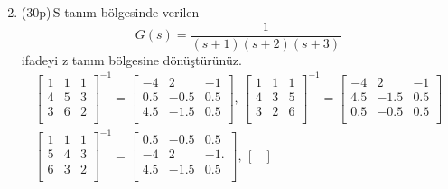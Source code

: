 \begin{enumerate}[\bfseries S1.]
\begin{equation*}
    \end{equation*}
    \item (30p)\,S tanım bölgesinde verilen 
    \begin{equation}
        G(s)=\frac{1}{(s+1)(s+2)(s+3)}
    \end{equation}
    ifadeyi z tanım bölgesine dönüştürünüz. 
    \begin{equation*}
    \begin{split}
        \begin{bmatrix}
            1&     1&     1\\
            4&     5&     3\\
            3&     6&     2\\
        \end{bmatrix}^{-1}=\begin{bmatrix}
            -4 &   2   &    -1\\
            0.5&   -0.5&    0.5\\
            4.5&   -1.5&    0.5\\
        \end{bmatrix},\,
        \begin{bmatrix}
            1&     1&     1\\
            4&     3&     5\\
            3&     2&     6\\
        \end{bmatrix}^{-1}=\begin{bmatrix}
            -4&    2&   -1\\
            4.5&   -1.5&    0.5\\
            0.5&  -0.5&    0.5\\
        \end{bmatrix}\\
        \begin{bmatrix}
            1&     1&     1\\
            5&     4&     3\\
            6&     3&     2\\
        \end{bmatrix}^{-1}=\begin{bmatrix}
        0.5 &  -0.5 &   0.5\\
        -4&    2&   -1.\\
        4.5 &  -1.5 &   0.5\\
        \end{bmatrix},\,
        \begin{bmatrix}

\end{bmatrix}
\end{split}
\end{equation*}
\end{enumerate}
